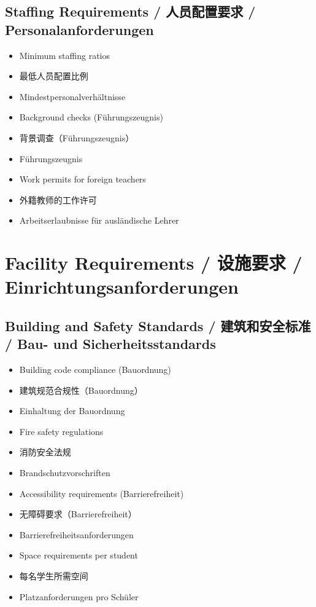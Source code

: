 \subsection{Staffing Requirements / 人员配置要求 / Personalanforderungen}
\begin{itemize}
    \item Minimum staffing ratios
    \item 最低人员配置比例
    \item Mindestpersonalverhältnisse
    \item Background checks (Führungszeugnis)
    \item 背景调查（Führungszeugnis）
    \item Führungszeugnis
    \item Work permits for foreign teachers
    \item 外籍教师的工作许可
    \item Arbeitserlaubnisse für ausländische Lehrer
\end{itemize}

\section{Facility Requirements / 设施要求 / Einrichtungsanforderungen}

\subsection{Building and Safety Standards / 建筑和安全标准 / Bau- und Sicherheitsstandards}
\begin{itemize}
    \item Building code compliance (Bauordnung)
    \item 建筑规范合规性（Bauordnung）
    \item Einhaltung der Bauordnung
    \item Fire safety regulations
    \item 消防安全法规
    \item Brandschutzvorschriften
    \item Accessibility requirements (Barrierefreiheit)
    \item 无障碍要求（Barrierefreiheit）
    \item Barrierefreiheitsanforderungen
    \item Space requirements per student
    \item 每名学生所需空间
    \item Platzanforderungen pro Schüler
\end{itemize}

